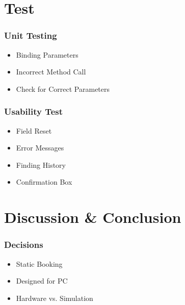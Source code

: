 \section{Test}

\begin{frame}
\frametitle{Unit Testing}
\begin{itemize}
	\item Binding Parameters
	\item Incorrect Method Call
	\item Check for Correct Parameters
\end{itemize}
\end{frame}

\begin{frame}
\frametitle{Usability Test}
\begin{itemize}
	\item Field Reset
	\item Error Messages
	\item Finding History
	\item Confirmation Box
\end{itemize}
\end{frame}

\section{Discussion \& Conclusion}
\begin{frame}
\frametitle{Decisions}
\begin{itemize}
	\item Static Booking
	\item Designed for PC
	\item Hardware vs. Simulation
\end{itemize}
\end{frame}

